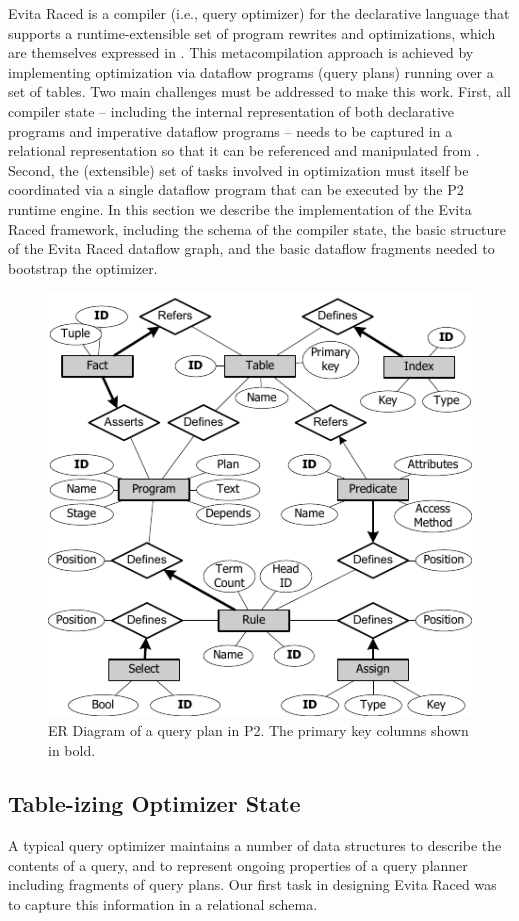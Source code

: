 Evita Raced is a compiler (i.e., query optimizer) for the \OVERLOG
declarative language that supports a runtime-extensible set of program
rewrites and optimizations, which are themselves expressed in \OVERLOG.
This metacompilation approach is achieved by implementing optimization
via dataflow programs  (query plans) running over a set of tables.  Two
main challenges must be addressed to make this work.  First, all
compiler state -- including the internal representation of both
declarative \OVERLOG programs and imperative dataflow programs -- needs
to be captured in a relational representation so that it can be
referenced and manipulated from \OVERLOG.  Second, the (extensible) set
of tasks involved in optimization must itself be coordinated via a
single dataflow program that can be executed by the P2 runtime engine.
In this section we describe the implementation of the Evita Raced
framework, including the schema of the compiler state, the basic
structure of the Evita Raced dataflow graph, and the basic dataflow
fragments needed to bootstrap the optimizer.

\begin{figure}
\ssp
\begin{center}
\includegraphics{figures/ERDiagram}
\caption{{ER Diagram of a query plan in P2. The primary key columns shown in bold.}}
\label{ch:evita:fig:p2er}
\end{center}
\end{figure}
\subsection{Table-izing Optimizer State}
A typical query optimizer maintains a number of data structures to describe the contents 
of a query, and to represent ongoing properties of a query planner including fragments of 
query plans.  Our first task in designing Evita Raced was to capture this information in a 
relational schema.

